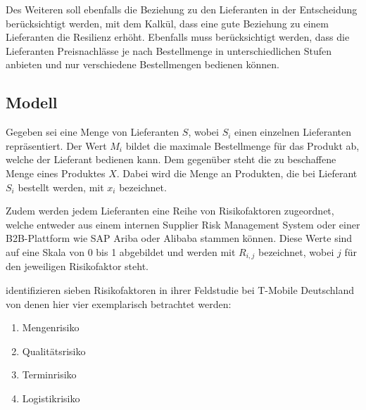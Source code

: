 Des Weiteren soll ebenfalls die Beziehung zu den Lieferanten in der Entscheidung berücksichtigt werden, mit dem Kalkül, dass eine gute Beziehung zu einem Lieferanten die Resilienz erhöht.
Ebenfalls muss berücksichtigt werden, dass die Lieferanten Preisnachlässe je nach Bestellmenge in unterschiedlichen Stufen anbieten und nur verschiedene Bestellmengen bedienen können.

\subsection{Modell}\label{subsec:model}



Gegeben sei eine Menge von Lieferanten $S$, wobei $S_i$ einen einzelnen Lieferanten repräsentiert.
Der Wert $M_i$ bildet die maximale Bestellmenge für das Produkt ab, welche der Lieferant bedienen kann.
Dem gegenüber steht die zu beschaffene Menge eines Produktes $X$.
Dabei wird die Menge an Produkten, die bei Lieferant $S_i$ bestellt werden, mit $x_i$ bezeichnet.

Zudem werden jedem Lieferanten eine Reihe von Risikofaktoren zugeordnet, welche entweder aus einem internen Supplier Risk Management System oder einer B2B-Plattform wie SAP Ariba oder Alibaba stammen können.
Diese Werte sind auf eine Skala von 0 bis 1 abgebildet und werden mit $R_{i,j}$ bezeichnet, wobei $j$ für den jeweiligen Risikofaktor steht.

\cite{conte_supplier_2005} identifizieren sieben Risikofaktoren in ihrer Feldstudie bei T-Mobile Deutschland von denen hier vier exemplarisch betrachtet werden:

\begin{enumerate}
  \item Mengenrisiko
  \item Qualitätsrisiko
  \item Terminrisiko
  \item Logistikrisiko
\end{enumerate}

